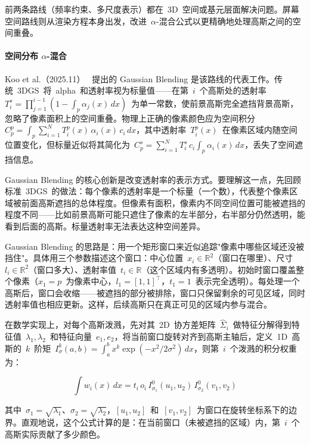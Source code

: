 前两条路线（频率约束、多尺度表示）都在~3D~空间或基元层面解决问题。屏幕空间路线则从渲染方程本身出发，改进~$\alpha$-混合公式以更精确地处理高斯之间的空间重叠。

\paragraph{空间分布 $\alpha$-混合}

Koo et al.（2025.11）~\cite{2511_15102} 提出的 Gaussian Blending 是该路线的代表工作。传统~3DGS~将~alpha~和透射率视为标量值——在第~$i$~个高斯处的透射率~$T_i^s = \prod_{j=1}^{i-1}(1 - \int_p \alpha_j(x)\,dx)$~为单一常数，使前景高斯完全遮挡背景高斯，忽略了像素面积上的空间重叠。物理上正确的像素颜色应为空间积分~$C_p^p = \int_p \sum_{i=1}^N T_i^p(x)\,\alpha_i(x)\,c_i\,dx$，其中透射率~$T_i^p(x)$~在像素区域内随空间位置变化，但标量近似将其简化为~$C_p^s = \sum_{i=1}^N T_i^s\,c_i \int_p \alpha_i(x)\,dx$，丢失了空间遮挡信息。

Gaussian Blending 的核心创新是改变透射率的表示方式。要理解这一点，先回顾标准~3DGS~的做法：每个像素的透射率是一个标量（一个数），代表整个像素区域被前面高斯遮挡的总体程度。但像素有面积，像素内不同空间位置可能被遮挡的程度不同——比如前景高斯可能只遮住了像素的左半部分，右半部分仍然透明，能看到后面的高斯。标量透射率无法表达这种空间差异。

Gaussian Blending 的思路是：用一个矩形窗口来近似追踪"像素中哪些区域还没被挡住"。具体用三个参数描述这个窗口：中心位置~$x_i \in \mathbb{R}^2$（窗口在哪里）、尺寸~$l_i \in \mathbb{R}^2$（窗口多大）、透射率值~$t_i \in \mathbb{R}$（这个区域内有多透明）。初始时窗口覆盖整个像素（$x_1 = p$~为像素中心，$l_1 = [1,1]^\top$，$t_1 = 1$~表示完全透明）。每处理一个高斯后，窗口会收缩——被遮挡的部分被排除，窗口只保留剩余的可见区域，同时透射率值也相应更新。这样，后续高斯只在真正可见的区域内参与混合。

在数学实现上，对每个高斯泼溅，先对其~2D~协方差矩阵~$\hat{\Sigma}_i$~做特征分解得到特征值~$\lambda_1, \lambda_2$~和特征向量~$e_1, e_2$，将当前窗口旋转对齐到高斯主轴后，定义~1D~高斯的~$k$~阶矩~$I_\sigma^k(a,b) = \int_a^b x^k \exp(-x^2/2\sigma^2)\,dx$，则第~$i$~个泼溅的积分权重为：

\begin{equation}
\int w_i(x)\,dx = t_i\,o_i\,I_{\sigma_1}^0(u_1, u_2)\,I_{\sigma_2}^0(v_1, v_2)
\end{equation}

其中~$\sigma_1 = \sqrt{\lambda_1}$、$\sigma_2 = \sqrt{\lambda_2}$，$[u_1, u_2]$~和~$[v_1, v_2]$~为窗口在旋转坐标系下的边界。直观地说，这个公式计算的是：在当前窗口（未被遮挡的区域）内，第~$i$~个高斯实际贡献了多少颜色。

